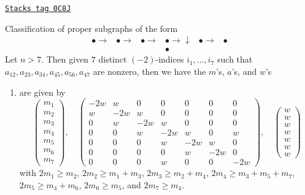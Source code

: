 \begin{lemma}[E7]
\label{models-lemma-E7}
\href{https://stacks.math.columbia.edu/tag/0C8J}{\texttt{Stacks tag 0C8J}}

Classification of proper subgraphs of the form
$$
\begin{array}{cccccc}\bullet \longrightarrow & \bullet \longrightarrow & \bullet \longrightarrow & \bullet \longrightarrow\downarrow & \bullet \longrightarrow & \bullet \\  &  &  & \bullet &  & \end{array}
$$
Let $n > 7$. Then given $7$ distinct $(-2)$-indices $i_1, \ldots, i_7$
such that $a_{12}, a_{23}, a_{34}, a_{45}, a_{56}, a_{47}$ are nonzero,
then we have the $m$'s, $a$'s, and $w$'s
\begin{enumerate}
\item
\label{models-item-E7}
are given by
$$
\left(
\begin{matrix}
m_1 \\
m_2 \\
m_3 \\
m_4 \\
m_5 \\
m_6 \\
m_7
\end{matrix}
\right),
\quad
\left(
\begin{matrix}
-2w & w & 0 & 0 & 0 & 0 & 0 \\
w & -2w & w & 0 & 0 & 0 & 0 \\
0 & w & -2w & w & 0 & 0 & 0 \\
0 & 0 & w & -2w & w & 0 & w \\
0 & 0 & 0 & w & -2w & w & 0 \\
0 & 0 & 0 & 0 & w & -2w & 0 \\
0 & 0 & 0 & w & 0 & 0 & -2w
\end{matrix}
\right),
\quad
\left(
\begin{matrix}
w \\
w \\
w \\
w \\
w \\
w \\
w
\end{matrix}
\right)
$$
with $2m_1 \geq m_2$, $2m_2 \geq m_1 + m_3$, $2m_3 \geq m_2 + m_4$,
$2m_4 \geq m_3 + m_5 + m_7$, $2m_5 \geq m_4 + m_6$, $2m_6 \geq m_5$,
and $2m_7 \geq m_4$.
\end{enumerate}
\end{lemma}

